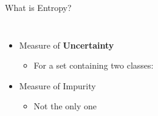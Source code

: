 \documentclass[aspectratio=169, 14pt]{beamer}
\begin{document}
\begin{frame}{What is Entropy?}
	\begin{columns}
	\begin{itemize}
		\item<1-> Measure of \textbf{Uncertainty}
			\begin{itemize}
				\item<1-> For a set containing two classes: 
			\end{itemize}
			
		\item<3-> Measure of Impurity
			\begin{itemize}
				\item<3-> Not the only one
			\end{itemize}
	\end{itemize}
	\end{columns}
\end{frame}
\end{document}
